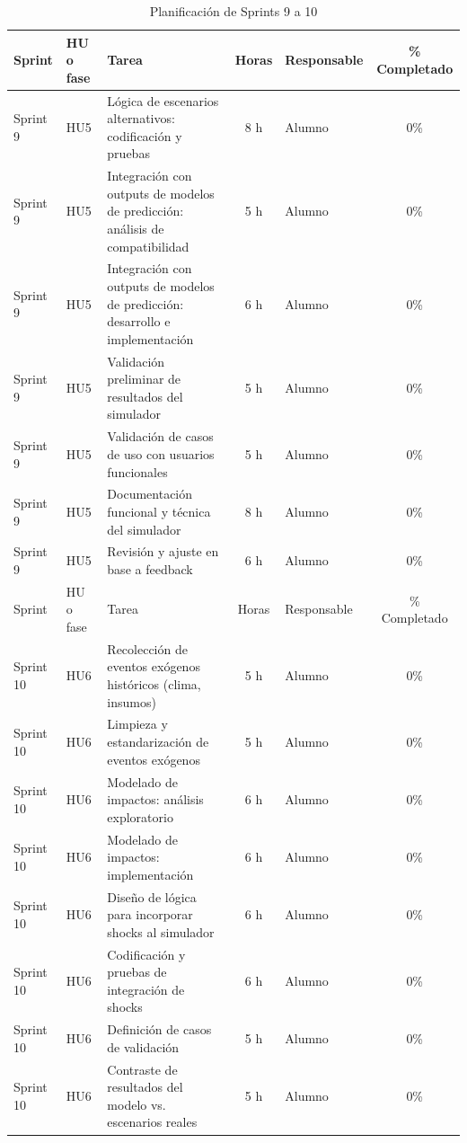 \documentclass[
11pt, %
]{charter}
\begin{document}
\begin{table}[htpb]
\centering
\caption{Planificación de Sprints 9 a 10}
\begin{tabularx}{\linewidth}{@{}|l|l|X|c|l|c|@{}}
\hline
\rowcolor[HTML]{C0C0C0}
Sprint & HU o fase & Tarea & Horas & Responsable & \% Completado \\ \hline
Sprint 9 & HU5 & Lógica de escenarios alternativos: codificación y pruebas & 8 h & Alumno & 0\% \\ \hline
Sprint 9 & HU5 & Integración con outputs de modelos de predicción: análisis de compatibilidad & 5 h & Alumno & 0\% \\ \hline
Sprint 9 & HU5 & Integración con outputs de modelos de predicción: desarrollo e implementación & 6 h & Alumno & 0\% \\ \hline
Sprint 9 & HU5 & Validación preliminar de resultados del simulador & 5 h & Alumno & 0\% \\ \hline
Sprint 9 & HU5 & Validación de casos de uso con usuarios funcionales & 5 h & Alumno & 0\% \\ \hline
Sprint 9 & HU5 & Documentación funcional y técnica del simulador & 8 h & Alumno & 0\% \\ \hline
Sprint 9 & HU5 & Revisión y ajuste en base a feedback & 6 h & Alumno & 0\% \\ \hline
\hline
Sprint & HU o fase & Tarea & Horas & Responsable & \% Completado \\ \hline
Sprint 10 & HU6 & Recolección de eventos exógenos históricos (clima, insumos) & 5 h & Alumno & 0\% \\ \hline
Sprint 10 & HU6 & Limpieza y estandarización de eventos exógenos & 5 h & Alumno & 0\% \\ \hline
Sprint 10 & HU6 & Modelado de impactos: análisis exploratorio & 6 h & Alumno & 0\% \\ \hline
Sprint 10 & HU6 & Modelado de impactos: implementación & 6 h & Alumno & 0\% \\ \hline
Sprint 10 & HU6 & Diseño de lógica para incorporar shocks al simulador & 6 h & Alumno & 0\% \\ \hline
Sprint 10 & HU6 & Codificación y pruebas de integración de shocks & 6 h & Alumno & 0\% \\ \hline
Sprint 10 & HU6 & Definición de casos de validación & 5 h & Alumno & 0\% \\ \hline
Sprint 10 & HU6 & Contraste de resultados del modelo vs. escenarios reales & 5 h & Alumno & 0\% \\ \hline
\end{tabularx}
\end{table}
\end{document}
